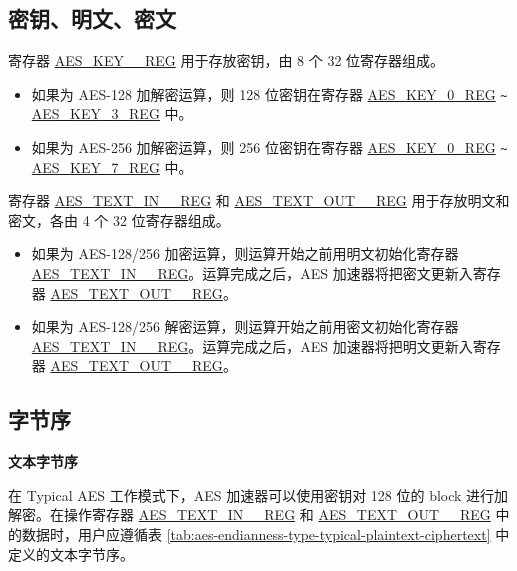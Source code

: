 \documentclass[main\_\_CN.tex]{subfiles}
\begin{document}
\subsection{密钥、明文、密文}

寄存器 \hyperref[regdesc:AESKEYnREG]{AES\_KEY\_\_REG} 用于存放密钥，由 8 个 32 位寄存器组成。

\begin{itemize}
    \item 如果为 AES-128 加解密运算，则 128 位密钥在寄存器 \hyperref[regdesc:AESKEYnREG]{AES\_KEY\_0\_REG} \verb+~+ \hyperref[regdesc:AESKEYnREG]{AES\_KEY\_3\_REG} 中。
    \item 如果为 AES-256 加解密运算，则 256 位密钥在寄存器 \hyperref[regdesc:AESKEYnREG]{AES\_KEY\_0\_REG} \verb+~+ \hyperref[regdesc:AESKEYnREG]{AES\_KEY\_7\_REG} 中。
\end{itemize}

寄存器 \hyperref[regdesc:AESTEXTINnREG]{AES\_TEXT\_IN\_\_REG} 和 \hyperref[regdesc:AESTEXTOUTnREG]{AES\_TEXT\_OUT\_\_REG} 用于存放明文和密文，各由 4 个 32 位寄存器组成。

\begin{itemize}
    \item 如果为 AES-128/256 加密运算，则运算开始之前用明文初始化寄存器 \hyperref[regdesc:AESTEXTINnREG]{AES\_TEXT\_IN\_\_REG}。运算完成之后，AES 加速器将把密文更新入寄存器 \hyperref[regdesc:AESTEXTOUTnREG]{AES\_TEXT\_OUT\_\_REG}。
    \item 如果为 AES-128/256 解密运算，则运算开始之前用密文初始化寄存器 \hyperref[regdesc:AESTEXTINnREG]{AES\_TEXT\_IN\_\_REG}。运算完成之后，AES 加速器将把明文更新入寄存器 \hyperref[regdesc:AESTEXTOUTnREG]{AES\_TEXT\_OUT\_\_REG}。
\end{itemize}

\subsection{字节序}

\textbf{文本字节序}

在 Typical AES 工作模式下，AES 加速器可以使用密钥对 128 位的 block 进行加解密。在操作寄存器 \hyperref[regdesc:AESTEXTINnREG]{AES\_TEXT\_IN\_\_REG} 和 \hyperref[regdesc:AESTEXTINnREG]{AES\_TEXT\_OUT\_\_REG} 中的数据时，用户应遵循表 \ref{tab:aes-endianness-type-typical-plaintext-ciphertext} 中定义的文本字节序。

\end{document}
